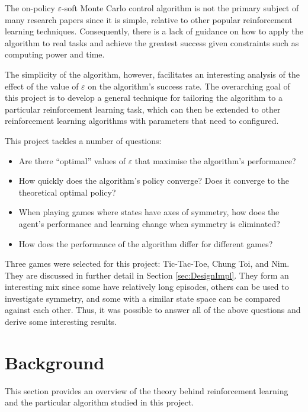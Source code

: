 \documentclass[11pt,a4paper]{report}
\begin{document}
The on-policy $\varepsilon$-soft Monte Carlo control algorithm is not the primary subject of many research papers since it is simple, relative to other popular reinforcement learning techniques. Consequently, there is a lack of guidance on how to apply the algorithm to real tasks and achieve the greatest success given constraints such as computing power and time.

The simplicity of the algorithm, however, facilitates an interesting analysis of the effect of the value of $\varepsilon$ on the algorithm's success rate. The overarching goal of this project is to develop a general technique for tailoring the algorithm to a particular reinforcement learning task, which can then be extended to other reinforcement learning algorithms with parameters that need to configured.

This project tackles a number of questions:

\begin{itemize}
	\item Are there ``optimal'' values of $\varepsilon$ that maximise the algorithm's performance?
	\item How quickly does the algorithm's policy converge? Does it converge to the theoretical optimal policy?
	\item When playing games where states have axes of symmetry, how does the agent's 
performance and learning change when symmetry is eliminated?
	\item How does the performance of the algorithm differ for different games?
\end{itemize}

Three games were selected for this project: Tic-Tac-Toe, Chung Toi, and Nim. They are discussed in further detail in Section \ref{sec:DesignImpl}. They form an interesting mix since some have relatively long episodes, others can be used to investigate symmetry, and some with a similar state space can be compared against each other. Thus, it was possible to answer all of the above questions and derive some interesting results.



\chapter{Background}

This section provides an overview of the theory behind reinforcement learning and the particular algorithm studied in this project.
\end{document}
